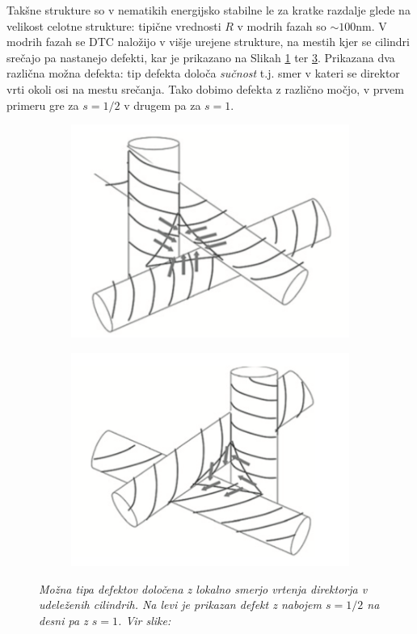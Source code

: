 \documentclass[longbibliography,slovene,a4paper,12pt]{book}
\begin{document}
Takšne strukture so v nematikih energijsko stabilne le za kratke razdalje glede na velikost celotne strukture: tipične vrednosti $R$ v modrih fazah so $\sim 100$nm. V modrih fazah se DTC naložijo v višje urejene strukture, na mestih kjer se cilindri srečajo pa nastanejo defekti, kar je prikazano na Slikah \ref{fig:dtcdefect1} ter \ref{fig:dtcdefect2}. Prikazana dva različna možna defekta: tip defekta določa \emph{sučnost} t.j. smer v kateri se direktor vrti okoli osi na mestu srečanja. Tako dobimo defekta z različno močjo, v prvem primeru gre za $s=1/2$ v drugem pa za $s=1$.
\begin{figure}[h!]
	\centering
	\begin{subfigure}[b]{0.4\textwidth}
	\includegraphics[width=\textwidth]{slike/dtc_defect_1.png}
	\label{fig:dtcdefect1}
	\end{subfigure}
	\begin{subfigure}[b]{0.4\textwidth}
	\includegraphics[width=\textwidth]{slike/dtc_defect_2.png}
	\label{fig:dtcdefect2}
	\end{subfigure}
	\caption{\emph{Možna tipa defektov določena z lokalno smerjo vrtenja direktorja v udeleženih cilindrih. Na levi je prikazan defekt z nabojem $s = 1/2$ na desni pa z $s=1$. Vir slike:}}
\end{figure}
 
\end{document}
